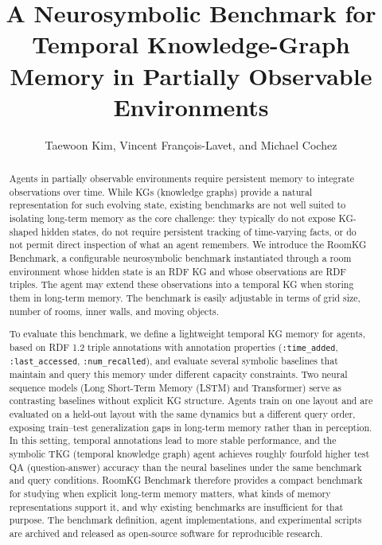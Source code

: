 \documentclass[Afour,sageh,times]{sagej}
\begin{document}

\title{A Neurosymbolic Benchmark for Temporal Knowledge-Graph Memory in Partially Observable Environments}

\author{Taewoon Kim, Vincent Fran\c{c}ois-Lavet, and Michael Cochez}




\begin{abstract}
Agents in partially observable environments require persistent memory to integrate
observations over time. While KGs (knowledge graphs) provide a natural representation
for such evolving state, existing benchmarks are not well suited to isolating long-term
memory as the core challenge: they typically do not expose KG-shaped hidden states, do
not require persistent tracking of time-varying facts, or do not permit direct
inspection of what an agent remembers. We introduce the RoomKG Benchmark, a
configurable neurosymbolic benchmark instantiated through a room environment whose
hidden state is an RDF KG and whose observations are RDF triples. The agent may extend
these observations into a temporal KG when storing them in long-term memory. The
benchmark is easily adjustable in terms of grid size, number of rooms, inner walls, and
moving objects.

To evaluate this benchmark, we define a lightweight temporal KG memory for agents,
based on RDF 1.2 triple annotations with
annotation properties (\texttt{:time\_added}, \texttt{:last\_accessed}, \texttt{:num\_recalled}), and
evaluate several symbolic baselines that maintain and query this memory under different
capacity constraints. Two neural sequence models (Long Short-Term Memory (LSTM) and
Transformer) serve as
contrasting baselines without explicit KG structure. Agents train on one layout and are
evaluated on a held-out layout with the same dynamics but a different query order,
exposing train–test generalization gaps in long-term memory rather than in perception.
In this setting, temporal annotations lead to more stable performance, and the symbolic
TKG (temporal knowledge graph) agent achieves roughly fourfold higher test QA
(question-answer) accuracy than the neural baselines under the same benchmark and query
conditions. RoomKG Benchmark therefore provides a compact benchmark for studying when
explicit long-term memory matters, what kinds of memory representations support it, and
why existing benchmarks are insufficient for that purpose. The benchmark definition,
agent implementations, and experimental scripts are archived and released as open-source
software for reproducible research.

\end{abstract}
\end{document}
